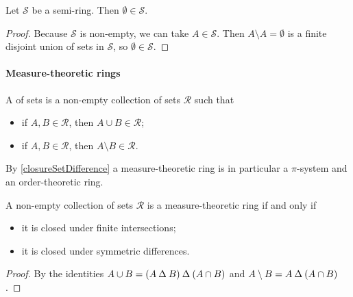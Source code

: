 \begin{lemma}
Let $\mathcal{S}$ be a semi-ring. Then $\emptyset \in \mathcal{S}$.
\end{lemma}
\begin{proof}
Because $\mathcal{S}$ is non-empty, we can take $A\in \mathcal{S}$. Then $A\setminus A = \emptyset$ is a finite disjoint union of sets in $\mathcal{S}$, so $\emptyset \in \mathcal{S}$.
\end{proof}

\paragraph{Measure-theoretic rings}
\begin{definition}
A  of sets is a non-empty collection of sets $\mathcal{R}$ such that
\begin{itemize}
\item if $A,B\in \mathcal{R}$, then $A\cup B\in \mathcal{R}$;
\item if $A,B\in \mathcal{R}$, then $A\setminus B\in \mathcal{R}$.
\end{itemize}
\end{definition}
By \ref{closureSetDifference} a measure-theoretic ring is in particular a $\pi$-system and an order-theoretic ring.

\begin{lemma}
A non-empty collection of sets $\mathcal{R}$ is a measure-theoretic ring \textup{if and only if}
\begin{itemize}
\item it is closed under finite intersections;
\item it is closed under symmetric differences.
\end{itemize}
\end{lemma}
\begin{proof}
By the identities $A\cup B = (A\mathbin{\Delta} B)\mathbin{\Delta} (A\cap B)$ and $A\setminus B = A\mathbin{\Delta} (A\cap B)$.
\end{proof}

